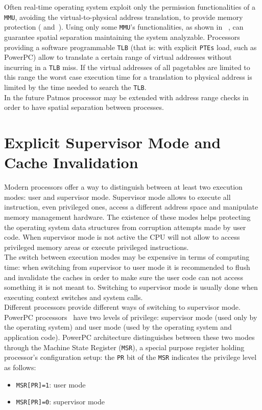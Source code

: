 Often real-time operating system exploit only the permission functionalities of a \texttt{MMU}, avoiding the virtual-to-physical address translation, to provide memory protection (\cite{Simpson:2005:SPE:1086297.1086307} and~\cite{Memprot:2004}).
Using only some \texttt{MMU}'s functionalities, as shown in ~\cite{10.1109/EMRTS.2001.934028}, can guarantee spatial separation maintaining the system analyzable. Processors providing a software programmable \texttt{TLB} (that is: with explicit \texttt{PTEs} load, such as PowerPC) allow to translate a certain range of virtual addresses without incurring in a \texttt{TLB} miss. If the virtual addresses of all pagetables are limited to this range the worst case execution time for a translation to physical address is limited by the time needed to search the \texttt{TLB}.\\ In the future Patmos processor may be extended with address range checks in order to have spatial separation between processes.

\section{Explicit Supervisor Mode and Cache Invalidation}\label{sec:explicit supervisor mode and cache invalidation}

Modern processors offer a way to distinguish between at least two execution modes: user and supervisor mode. Supervisor mode allows to execute all instruction, even privileged ones, access a different address space and manipulate memory management hardware. The existence of these modes helps protecting the operating system data structures from corruption attempts made by user code. When supervisor mode is not active the CPU will not allow to access privileged memory areas or execute privileged instructions.\\

The switch between execution modes may be expensive in terms of computing time: when switching from supervisor to user mode it is recommended to flush and invalidate the caches in order to make sure the user code can not access something it is not meant to. Switching to supervisor mode is usually done when executing context switches and system calls.\\

Different processors provide different ways of switching to supervisor mode.\\ PowerPC processors~\cite{PPCEnv:2005} have two levels of privilege: supervisor mode (used only by the operating system) and user mode (used by the operating system and application code). PowerPC architecture distinguishes between these two modes through the Machine State Register (\texttt{MSR}), a special purpose register holding processor's configuration setup: the \texttt{PR} bit of the \texttt{MSR} indicates the privilege level as follows:
\begin{itemize}
	\item \texttt{MSR[PR]=1}: user mode
	\item \texttt{MSR[PR]=0}: supervisor mode
\end{itemize}

